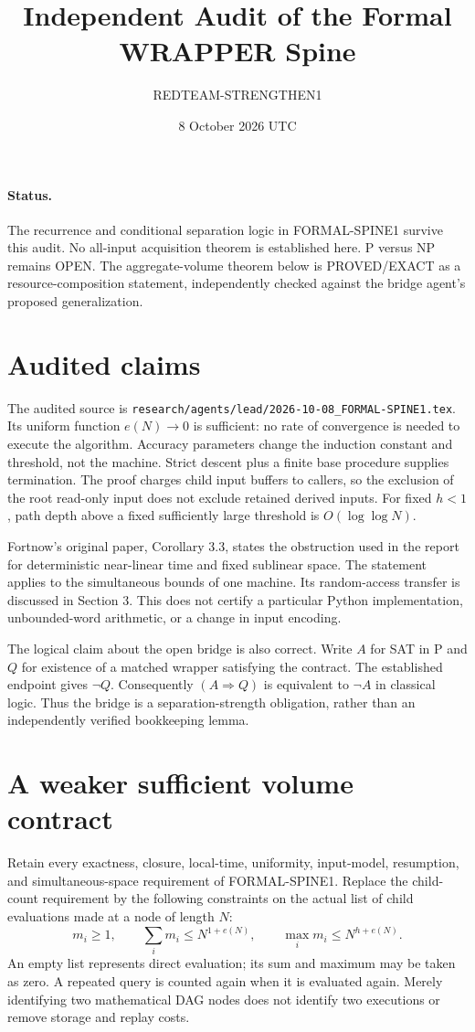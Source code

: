 \documentclass[11pt]{article}
\title{Independent Audit of the Formal WRAPPER Spine}
\author{REDTEAM-STRENGTHEN1}
\date{8 October 2026 UTC}
\begin{document}
\maketitle
\paragraph{Status.} The recurrence and conditional separation logic in
FORMAL-SPINE1 survive this audit. No all-input acquisition theorem is
established here. P versus NP remains OPEN. The aggregate-volume theorem
below is PROVED/EXACT as a resource-composition statement, independently
checked against the bridge agent's proposed generalization.

\section{Audited claims}
The audited source is
\texttt{research/agents/lead/2026-10-08\_FORMAL-SPINE1.tex}.
Its uniform function $e(N)\to0$ is sufficient: no rate of convergence is
needed to execute the algorithm. Accuracy parameters change the induction
constant and threshold, not the machine. Strict descent plus a finite
base procedure supplies termination. The proof charges child input
buffers to callers, so the exclusion of the root read-only input does
not exclude retained derived inputs. For fixed $h<1$, path depth above a
fixed sufficiently large threshold is $O(\log\log N)$.

Fortnow's original paper, Corollary 3.3, states the obstruction used in
the report for deterministic near-linear time and fixed sublinear space.
The statement applies to the simultaneous bounds of one machine. Its
random-access transfer is discussed in Section 3. This does not certify
a particular Python implementation, unbounded-word arithmetic, or a
change in input encoding.

The logical claim about the open bridge is also correct. Write $A$ for
SAT in P and $Q$ for existence of a matched wrapper satisfying the
contract. The established endpoint gives $\neg Q$. Consequently
$(A\Rightarrow Q)$ is equivalent to $\neg A$ in classical logic. Thus
the bridge is a separation-strength obligation, rather than an
independently verified bookkeeping lemma.

\section{A weaker sufficient volume contract}
Retain every exactness, closure, local-time, uniformity, input-model,
resumption, and simultaneous-space requirement of FORMAL-SPINE1.
Replace the child-count requirement by the following constraints on the
actual list of child evaluations made at a node of length $N$:
\[
 m_i\ge1,\qquad \sum_i m_i\le N^{1+e(N)},\qquad
 \max_i m_i\le N^{h+e(N)}.
\]
An empty list represents direct evaluation; its sum and maximum may be
taken as zero. A repeated query is counted again when it is evaluated
again. Merely identifying two mathematical DAG nodes does not identify
two executions or remove storage and replay costs.
\end{document}
